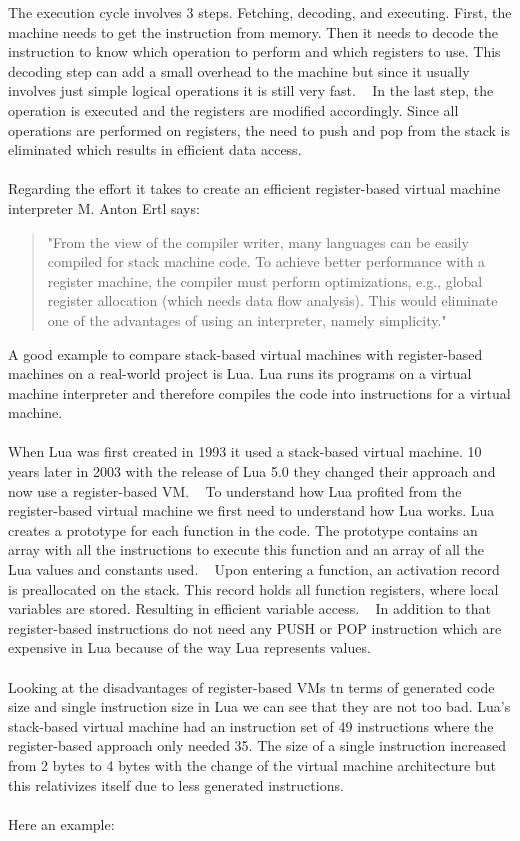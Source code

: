 \documentclass{article}
\begin{document}
The execution cycle involves 3 steps. Fetching, decoding, and executing. First,
the machine needs to get the instruction from memory. Then it needs to decode
the instruction to know which operation to perform and which registers to use.
This decoding step can add a small overhead to the machine but since it usually
involves just simple logical operations it is still very fast. ~\cite{modern}
In the last step, the operation is executed and the registers are modified
accordingly. Since all operations are performed on registers, the need to push
and pop from the stack is eliminated which results in efficient data access.
~\cite{vmgen}
\\\\
Regarding the effort it takes to create an efficient register-based virtual
machine interpreter M. Anton Ertl says:

\begin{quotation}
"From the view of the compiler writer, many languages can be easily compiled for
stack machine code. To achieve better performance with a register machine, the
compiler must perform optimizations, e.g., global register allocation (which
needs data flow analysis). This would eliminate one of the advantages of using an
interpreter, namely simplicity." ~\cite{stack_caching_for_interpreters}
\end{quotation}

A good example to compare stack-based virtual machines with register-based
machines on a real-world project is Lua. Lua runs its programs on a virtual
machine interpreter and therefore compiles the code into instructions for a
virtual machine.
\\\\
When Lua was first created in 1993 it used a stack-based virtual machine. 10
years later in 2003 with the release of Lua 5.0 they changed their
approach and now use a register-based VM. ~\cite{lua_implementation}
To understand how Lua profited from the register-based virtual machine we first
need to understand how Lua works.
Lua creates a prototype for each function in the code. The prototype contains an
array with all the instructions to execute this function and an array of all the
Lua values and constants used. ~\cite{lua_implementation}
Upon entering a function, an activation record is preallocated on the stack.
This record holds all function registers, where local variables are stored.
Resulting in efficient variable access. ~\cite{lua_implementation}
In addition to that register-based instructions do not need any PUSH or POP
instruction which are expensive in Lua because of the way Lua represents
values.
\\\\
Looking at the disadvantages of register-based VMs tn terms of generated code
size and single instruction size in Lua we can see that they are not too bad.
Lua's stack-based virtual machine had an instruction set of 49 instructions
where the register-based approach only needed 35. The size of a single
instruction increased from 2 bytes to 4 bytes with the change of the virtual
machine architecture but this relativizes itself due to less generated
instructions.
\\\\
Here an example:
\end{document}
